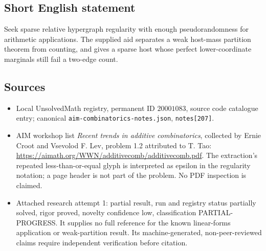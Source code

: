 \documentclass[11pt]{article}
\begin{document}
\subsection{Short English statement}
Seek sparse relative hypergraph regularity with enough pseudorandomness for arithmetic applications. The supplied aid separates a weak host-mass partition theorem from counting, and gives a sparse host whose perfect lower-coordinate marginals still fail a two-edge count.
\subsection{Sources}
\begin{itemize}
\item Local UnsolvedMath registry, permanent ID $20001083$, source code catalogue entry; canonical \texttt{aim-combinatorics-notes.json}, \texttt{notes[207]}.
\item AIM workshop list \emph{Recent trends in additive combinatorics}, collected by Ernie Croot and Vsevolod F. Lev, problem 1.2 attributed to T. Tao: \url{https://aimath.org/WWN/additivecomb/additivecomb.pdf}. The extraction's repeated less-than-or-equal glyph is interpreted as epsilon in the regularity notation; a page header is not part of the problem. No PDF inspection is claimed.
\item Attached research attempt 1: partial result, run and registry status partially solved, rigor proved, novelty confidence low, classification PARTIAL-PROGRESS. It supplies no full reference for the known linear-forms application or weak-partition result. Its machine-generated, non-peer-reviewed claims require independent verification before citation.
\end{itemize}
\end{document}
